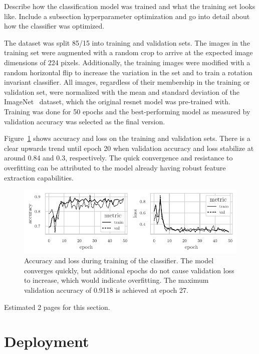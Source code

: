 \documentclass[draft,final]{vutinfth} %
\begin{document}
Describe how the classification model was trained and what the
training set looks like. Include a subsection hyperparameter
optimization and go into detail about how the classifier was
optimized.

The dataset was split 85/15 into training and validation sets. The
images in the training set were augmented with a random crop to arrive
at the expected image dimensions of 224 pixels. Additionally, the
training images were modified with a random horizontal flip to
increase the variation in the set and to train a rotation invariant
classifier. All images, regardless of their membership in the training
or validation set, were normalized with the mean and standard
deviation of the ImageNet~\cite{deng2009} dataset, which the original
\gls{resnet} model was pre-trained with. Training was done for 50
epochs and the best-performing model as measured by validation
accuracy was selected as the final version.

Figure~\ref{fig:classifier-training-metrics} shows accuracy and loss
on the training and validation sets. There is a clear upwards trend
until epoch 20 when validation accuracy and loss stabilize at around
0.84 and 0.3, respectively. The quick convergence and resistance to
overfitting can be attributed to the model already having robust
feature extraction capabilities.

\begin{figure}
  \centering
  \includegraphics{graphics/classifier-metrics.pdf}
  \caption[Classifier accuracy and loss during training.]{Accuracy and
    loss during training of the classifier. The model converges
    quickly, but additional epochs do not cause validation loss to
    increase, which would indicate overfitting. The maximum validation
    accuracy of 0.9118 is achieved at epoch 27.}
  \label{fig:classifier-training-metrics}
\end{figure}

Estimated 2 pages for this section.

\section{Deployment}
\end{document}
